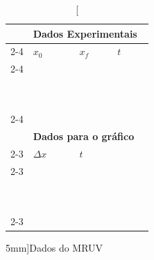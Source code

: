 \begin{table}[!ht]
\centering
\begin{tabular}{lp{25mm}p{25mm}p{25mm}l}
\toprule
	&\multicolumn{4}{l}{\textbf{Dados Experimentais}} \\
	\cmidrule{2-4}
	& $x_0$ & $x_f$ & $t$ & \\
	\cmidrule{2-4}
	& \cellcolor[gray]{0.89} & \cellcolor[gray]{0.92} & \cellcolor[gray]{0.89} \\
	& \cellcolor[gray]{0.95} & \cellcolor[gray]{0.97} & \cellcolor[gray]{0.95} \\
	& \cellcolor[gray]{0.89} & \cellcolor[gray]{0.92} & \cellcolor[gray]{0.89} \\
	& \cellcolor[gray]{0.95} & \cellcolor[gray]{0.97} & \cellcolor[gray]{0.95} \\
	& \cellcolor[gray]{0.89} & \cellcolor[gray]{0.92} & \cellcolor[gray]{0.89} \\
	& \cellcolor[gray]{0.95} & \cellcolor[gray]{0.97} & \cellcolor[gray]{0.95} \\
	& \cellcolor[gray]{0.89} & \cellcolor[gray]{0.92} & \cellcolor[gray]{0.89} \\
	& \cellcolor[gray]{0.95} & \cellcolor[gray]{0.97} & \cellcolor[gray]{0.95} \\
	& \cellcolor[gray]{0.89} & \cellcolor[gray]{0.92} & \cellcolor[gray]{0.89} \\
	& \cellcolor[gray]{0.95} & \cellcolor[gray]{0.97} & \cellcolor[gray]{0.95} \\
	\cmidrule{2-4}
\\
	& \multicolumn{3}{l}{\textbf{Dados para o gráfico}} \\
	\cmidrule{2-3}
	& $\Delta x$ & $t$ \\
	\cmidrule{2-3}
	& \cellcolor[gray]{0.89} & \cellcolor[gray]{0.92} \\
	& \cellcolor[gray]{0.95} & \cellcolor[gray]{0.97} \\
	& \cellcolor[gray]{0.89} & \cellcolor[gray]{0.92} \\
	& \cellcolor[gray]{0.95} & \cellcolor[gray]{0.97} \\
	& \cellcolor[gray]{0.89} & \cellcolor[gray]{0.92} \\
	& \cellcolor[gray]{0.95} & \cellcolor[gray]{0.97} \\
	& \cellcolor[gray]{0.89} & \cellcolor[gray]{0.92} \\
	& \cellcolor[gray]{0.95} & \cellcolor[gray]{0.97} \\
	& \cellcolor[gray]{0.89} & \cellcolor[gray]{0.92} \\
	& \cellcolor[gray]{0.95} & \cellcolor[gray]{0.97} \\
	\cmidrule{2-3}
\bottomrule
\end{tabular}
\caption[][5mm]{Dados do MRUV}
\label{DadosMRUV}
\end{table}

